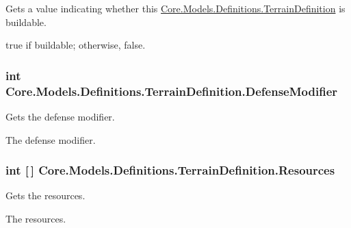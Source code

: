 Gets a value indicating whether this \hyperlink{classCore_1_1Models_1_1Definitions_1_1TerrainDefinition}{Core.\+Models.\+Definitions.\+Terrain\+Definition} is buildable. 

{\ttfamily true} if buildable; otherwise, {\ttfamily false}.\hypertarget{classCore_1_1Models_1_1Definitions_1_1TerrainDefinition_a2a06489b93795057da62a7fc004fa94f}{}
\subsubsection[{Defense\+Modifier}]{\setlength{\rightskip}{0pt plus 5cm}int Core.\+Models.\+Definitions.\+Terrain\+Definition.\+Defense\+Modifier\hspace{0.3cm}{\ttfamily [get]}}\label{classCore_1_1Models_1_1Definitions_1_1TerrainDefinition_a2a06489b93795057da62a7fc004fa94f}


Gets the defense modifier. 

The defense modifier.\hypertarget{classCore_1_1Models_1_1Definitions_1_1TerrainDefinition_add68e1feb4cb4743c55e94474e69d872}{}
\subsubsection[{Resources}]{\setlength{\rightskip}{0pt plus 5cm}int \mbox{[}$\,$\mbox{]} Core.\+Models.\+Definitions.\+Terrain\+Definition.\+Resources\hspace{0.3cm}{\ttfamily [get]}}\label{classCore_1_1Models_1_1Definitions_1_1TerrainDefinition_add68e1feb4cb4743c55e94474e69d872}


Gets the resources. 

The resources.\hypertarget{classCore_1_1Models_1_1Definitions_1_1TerrainDefinition_aa1f619459353eedfb36c657b0eb370e7}{}
